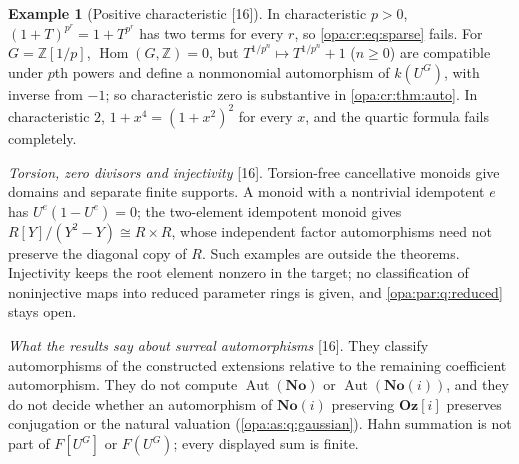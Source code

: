 \documentclass[11pt,oneside]{article}
\numberwithin{equation}{section}
\theoremstyle{definition}
\newtheorem{example}[example]{Example}
\theoremstyle{remark}
\newcommand{\No}{\mathbf{No}}
\newcommand{\Og}{\mathbf{Oz}[i]}
\newcommand{\SC}{\mathbf{No}(i)}
\newcommand{\Z}{\mathbb Z}
\newcommand{\Aut}{\operatorname{Aut}}
\newcommand{\Hom}{\operatorname{Hom}}
\newcommand{\src}[1]{\textup{\textsf{\small[#1]}}}
\begin{document}
\begin{example}[Positive characteristic \src{16}]\label{opa:cr:ex:charp}
In characteristic $p>0$, $(1+T)^{p^r}=1+T^{p^r}$ has two terms for every $r$, so \eqref{opa:cr:eq:sparse} fails. For
$G=\Z[1/p]$, $\Hom(G,\Z)=0$, but $T^{1/p^n}\mapsto T^{1/p^n}+1$ ($n\ge0$) are compatible under $p$th powers and define a
nonmonomial automorphism of $k(U^G)$, with inverse from $-1$; so characteristic zero is substantive in
\cref{opa:cr:thm:auto}. In characteristic $2$, $1+x^4=(1+x^2)^2$ for every $x$, and the quartic formula fails completely.
\end{example}

\emph{Torsion, zero divisors and injectivity} \src{16}. Torsion-free cancellative monoids give domains and separate finite
supports. A monoid with a nontrivial idempotent $e$ has $U^e(1-U^e)=0$; the two-element idempotent monoid gives
$R[Y]/(Y^2-Y)\cong R\times R$, whose independent factor automorphisms need not preserve the diagonal copy of $R$. Such examples
are outside the theorems. Injectivity keeps the root element nonzero in the target; no classification of noninjective maps
into reduced parameter rings is given, and \cref{opa:par:q:reduced} stays open.

\emph{What the results say about surreal automorphisms} \src{16}. They classify automorphisms of the constructed extensions
relative to the remaining coefficient automorphism. They do not compute $\Aut(\No)$ or $\Aut(\SC)$, and they do not decide
whether an automorphism of $\SC$ preserving $\Og$ preserves conjugation or the natural valuation
(\cref{opa:as:q:gaussian}). Hahn summation is not part of $F[U^G]$ or $F(U^G)$; every displayed sum is finite.
\end{document}
